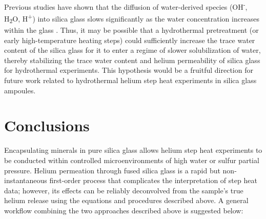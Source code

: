 Previous studies have shown that the diffusion of water-derived species (OH\textsuperscript{-}, H\textsubscript{2}O, H\textsuperscript{+}) into silica glass slows significantly as the water concentration increases within the glass \citep{oehler2004,davis1995}. Thus, it may be possible that a hydrothermal pretreatment (or early high-temperature heating steps) could sufficiently increase the trace water content of the silica glass for it to enter a regime of slower solubilization of water, thereby stabilizing the trace water content and helium permeability of silica glass for hydrothermal experiments. This hypothesis would be a fruitful direction for future work related to hydrothermal helium step heat experiments in silica glass ampoules.

\section{Conclusions}

Encapsulating minerals in pure silica glass allows helium step heat experiments to be conducted within controlled microenvironments of high water or sulfur partial pressure. Helium permeation through fused silica glass is a rapid but non-instantaneous first-order process that complicates the interpretation of step heat data; however, its effects can be reliably deconvolved from the sample's true helium release using the equations and procedures described above. A general workflow combining the two approaches described above is suggested below:

